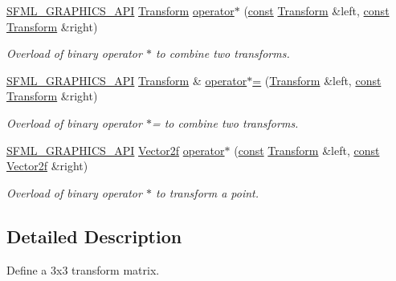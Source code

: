 \begin{DoxyCompactItemize}
\hyperlink{sfml_2dep_2_s_f_m_l-2_84_82_2include_2_s_f_m_l_2_graphics_2_export_8hpp_ab84c9f1035e146917de3bc0f98d72b35}{S\-F\-M\-L\-\_\-\-G\-R\-A\-P\-H\-I\-C\-S\-\_\-\-A\-P\-I} \hyperlink{classsf_1_1_transform}{Transform} \hyperlink{classsf_1_1_transform_a423ade8d6aa1378c695f8eb4bfce8981}{operator$\ast$} (\hyperlink{term__entry_8h_a57bd63ce7f9a353488880e3de6692d5a}{const} \hyperlink{classsf_1_1_transform}{Transform} \&left, \hyperlink{term__entry_8h_a57bd63ce7f9a353488880e3de6692d5a}{const} \hyperlink{classsf_1_1_transform}{Transform} \&right)
\begin{DoxyCompactList}\small\item\em Overload of binary operator $\ast$ to combine two transforms. \end{DoxyCompactList}\item 
\hyperlink{sfml_2dep_2_s_f_m_l-2_84_82_2include_2_s_f_m_l_2_graphics_2_export_8hpp_ab84c9f1035e146917de3bc0f98d72b35}{S\-F\-M\-L\-\_\-\-G\-R\-A\-P\-H\-I\-C\-S\-\_\-\-A\-P\-I} \hyperlink{classsf_1_1_transform}{Transform} \& \hyperlink{classsf_1_1_transform_a45a9de70a463117f851f1264a6f558ba}{operator$\ast$=} (\hyperlink{classsf_1_1_transform}{Transform} \&left, \hyperlink{term__entry_8h_a57bd63ce7f9a353488880e3de6692d5a}{const} \hyperlink{classsf_1_1_transform}{Transform} \&right)
\begin{DoxyCompactList}\small\item\em Overload of binary operator $\ast$= to combine two transforms. \end{DoxyCompactList}\item 
\hyperlink{sfml_2dep_2_s_f_m_l-2_84_82_2include_2_s_f_m_l_2_graphics_2_export_8hpp_ab84c9f1035e146917de3bc0f98d72b35}{S\-F\-M\-L\-\_\-\-G\-R\-A\-P\-H\-I\-C\-S\-\_\-\-A\-P\-I} \hyperlink{namespacesf_a80cea3c46537294fd1d8d428566ad8b2}{Vector2f} \hyperlink{classsf_1_1_transform_ac729169ec3036f3f3f3024c98efd041d}{operator$\ast$} (\hyperlink{term__entry_8h_a57bd63ce7f9a353488880e3de6692d5a}{const} \hyperlink{classsf_1_1_transform}{Transform} \&left, \hyperlink{term__entry_8h_a57bd63ce7f9a353488880e3de6692d5a}{const} \hyperlink{namespacesf_a80cea3c46537294fd1d8d428566ad8b2}{Vector2f} \&right)
\begin{DoxyCompactList}\small\item\em Overload of binary operator $\ast$ to transform a point. \end{DoxyCompactList}\end{DoxyCompactItemize}


\subsection{Detailed Description}
Define a 3x3 transform matrix. 

